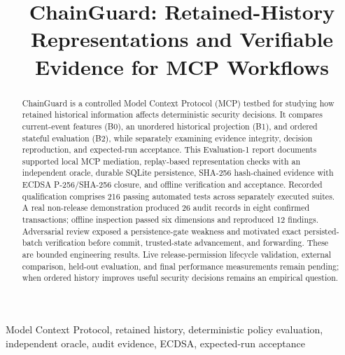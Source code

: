 \documentclass[conference]{IEEEtran}
\begin{document}
\title{ChainGuard: Retained-History Representations and Verifiable Evidence for MCP Workflows}

\author{
}

\maketitle

\begin{abstract}
ChainGuard is a controlled Model Context Protocol (MCP) testbed for studying how retained historical information affects deterministic security decisions. It compares current-event features (B0), an unordered historical projection (B1), and ordered stateful evaluation (B2), while separately examining evidence integrity, decision reproduction, and expected-run acceptance. This Evaluation-1 report documents supported local MCP mediation, replay-based representation checks with an independent oracle, durable SQLite persistence, SHA-256 hash-chained evidence with ECDSA P-256/SHA-256 closure, and offline verification and acceptance. Recorded qualification comprises 216 passing automated tests across separately executed suites. A real non-release demonstration produced 26 audit records in eight confirmed transactions; offline inspection passed six dimensions and reproduced 12 findings. Adversarial review exposed a persistence-gate weakness and motivated exact persisted-batch verification before commit, trusted-state advancement, and forwarding. These are bounded engineering results. Live release-permission lifecycle validation, external comparison, held-out evaluation, and final performance measurements remain pending; when ordered history improves useful security decisions remains an empirical question.
\end{abstract}

\begin{IEEEkeywords}
Model Context Protocol, retained history, deterministic policy evaluation, independent oracle, audit evidence, ECDSA, expected-run acceptance
\end{IEEEkeywords}
\end{document}
